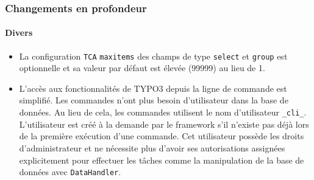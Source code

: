 \begin{frame}[fragile]
	\frametitle{Changements en profondeur}
	\framesubtitle{Divers}

	\begin{itemize}
		\item La configuration \texttt{TCA} \texttt{maxitems} des champs de type \texttt{select} et
			\texttt{group} est optionnelle et sa valeur par défaut est élevée (99999) au lieu de 1.

		\item L'accès aux fonctionnalités de TYPO3 depuis la ligne de commande est simplifié. Les commandes
			n'ont plus besoin d'utilisateur dans la base de données. Au lieu de cela, les commandes utilisent
			le nom d'utilisateur \texttt{\_cli\_}. L'utilisateur est créé à la demande par le framework s'il
			n'existe pas déjà lors de la première exécution d'une commande. Cet utilisateur possède les
			droits d'administrateur et ne nécessite plus d'avoir ses autorisations assignées explicitement
			pour effectuer les tâches comme la manipulation de la base de données avec \texttt{DataHandler}.

	\end{itemize}

\end{frame}

